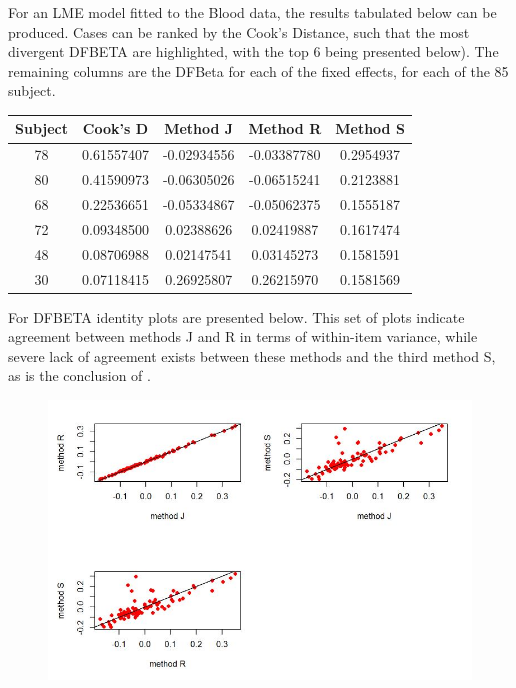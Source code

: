 \documentclass[12pt, a4paper]{report}
\theoremstyle{plain}
\theoremstyle{definition}
\theoremstyle{remark}
\begin{document}
For an LME model fitted to the Blood data, the results tabulated below can be produced.  Cases can be ranked by the Cook's Distance, such that the most divergent DFBETA are highlighted, with the top 6 being presented below). The remaining columns are the DFBeta for each of the fixed effects, for each of the 85 subject.
	\begin{center}
		\begin{tabular}{|c|c|c|c|c|} \hline
			Subject &    Cook's D  &    Method J  &   Method R  & Method S \\ \hline \hline
			78 & 0.61557407 & -0.02934556 & -0.03387780 & 0.2954937  \\ \hline
			80 & 0.41590973 & -0.06305026 & -0.06515241 & 0.2123881  \\ \hline
			68 & 0.22536651 & -0.05334867 & -0.05062375 & 0.1555187  \\ \hline
			72 & 0.09348500  & 0.02388626  & 0.02419887 & 0.1617474  \\ \hline
			48 & 0.08706988  & 0.02147541  & 0.03145273 & 0.1581591  \\ \hline
			30 & 0.07118415  & 0.26925807  & 0.26215970 & 0.1581569  \\ \hline
		\end{tabular}
	\end{center}
For DFBETA identity plots are presented below. This set of plots indicate agreement between methods J and R in terms of within-item variance, while severe lack of agreement exists between these methods and the third method S, as is the conclusion of \citet{ARoy2009}.	
	\begin{figure}[h!]
		\centering
		\includegraphics[width=1\linewidth]{images/04-DFbetaplots}
	\end{figure}
	
\end{document}
